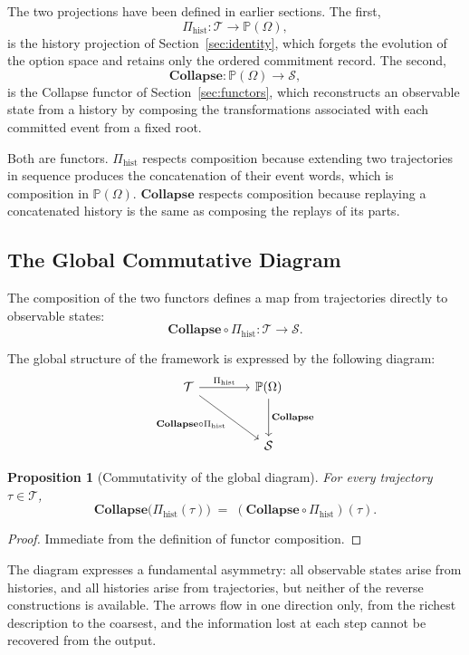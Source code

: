 \documentclass[12pt]{article}
\theoremstyle{plain}
\newtheorem{proposition}[theorem]{Proposition}
\theoremstyle{definition}
\theoremstyle{remark}
\newcommand{\Collapse}{\mathbf{Collapse}}
\newcommand{\PathCat}{\mathbb{P}(\Omega)}
\begin{document}
The two projections have been defined in earlier sections.  The first,
\[
  \Pi_{\mathrm{hist}} : \mathcal{T} \longrightarrow \PathCat,
\]
is the history projection of Section~\ref{sec:identity}, which forgets the
evolution of the option space and retains only the ordered commitment record.
The second,
\[
  \Collapse : \PathCat \longrightarrow \mathcal{S},
\]
is the Collapse functor of Section~\ref{sec:functors}, which reconstructs an
observable state from a history by composing the transformations associated
with each committed event from a fixed root.

Both are functors.  $\Pi_{\mathrm{hist}}$ respects composition because extending
two trajectories in sequence produces the concatenation of their event words,
which is composition in $\PathCat$.  $\Collapse$ respects composition because
replaying a concatenated history is the same as composing the replays of its
parts.

\subsection{The Global Commutative Diagram}

The composition of the two functors defines a map from trajectories directly to
observable states:
\[
  \Collapse \circ \Pi_{\mathrm{hist}} : \mathcal{T} \longrightarrow \mathcal{S}.
\]

The global structure of the framework is expressed by the following diagram:
\[
\begin{tikzcd}[column sep=4em, row sep=3em]
  \mathcal{T}
    \arrow[r, "\Pi_{\mathrm{hist}}"]
    \arrow[dr, swap, "\Collapse \circ \Pi_{\mathrm{hist}}"]
  &
  \PathCat
    \arrow[d, "\Collapse"]
  \\
  &
  \mathcal{S}
\end{tikzcd}
\]

\begin{proposition}[Commutativity of the global diagram]
For every trajectory $\tau \in \mathcal{T}$,
\[
  \Collapse\bigl(\Pi_{\mathrm{hist}}(\tau)\bigr)
  \;=\;
  (\Collapse \circ \Pi_{\mathrm{hist}})(\tau).
\]
\end{proposition}

\begin{proof}
Immediate from the definition of functor composition.
\end{proof}

The diagram expresses a fundamental asymmetry: all observable states arise from
histories, and all histories arise from trajectories, but neither of the reverse
constructions is available.  The arrows flow in one direction only, from the
richest description to the coarsest, and the information lost at each step
cannot be recovered from the output.
\end{document}
